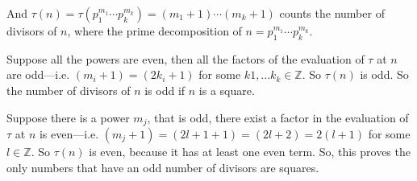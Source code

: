 \documentclass{article}
\begin{document}
And $\tau(n) = \tau(p_1^{m_1}\cdots p_k^{m_k}) = (m_1+1)\cdots(m_k+1)$
counts the number of divisors of $n$, where the prime decomposition of
$n = p_1^{m_1}\cdots p_k^{m_k}$.

Suppose all the powers are even, then all the factors of the
evaluation of $\tau$ at $n$ are odd---i.e. $(m_i +1) = (2k_i +1)$ for
some $k1,...k_k\in\mathbb{Z}.$ So $\tau(n)$ is odd. So the number of
divisors of $n$ is odd if $n$ is a square.

Suppose there is a power $m_j$, that is odd, there exist a factor in the
evaluation of $\tau$ at $n$ is even---i.e. $(m_j +1) = (2l + 1 +1) =
(2l+2) = 2(l+1)$ for
some $l \in\mathbb{Z}.$ So $\tau(n)$ is even, because it has at least
one even term. So, this proves the only numbers that have an odd
number of divisors are squares.
\end{document}
